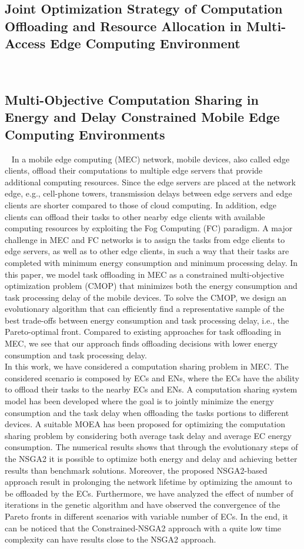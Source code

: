 \subsection{Joint Optimization Strategy of Computation Offloading and Resource Allocation in Multi-Access Edge Computing Environment}~\cite{li2020joint}


\subsection{Multi-Objective Computation Sharing in Energy and Delay Constrained Mobile Edge Computing Environments}~\cite{bozorgchenani2020multi}
In a mobile edge computing (MEC) network, mobile devices, also called edge clients, offload their computations to multiple
edge servers that provide additional computing resources. Since the edge servers are placed at the network edge, e.g., cell-phone
towers, transmission delays between edge servers and edge clients are shorter compared to those of cloud computing. In addition,
edge clients can offload their tasks to other nearby edge clients with available computing resources by exploiting the Fog Computing
(FC) paradigm. A major challenge in MEC and FC networks is to assign the tasks from edge clients to edge servers, as well as to other
edge clients, in such a way that their tasks are completed with minimum energy consumption and minimum processing delay. In this
paper, we model task offloading in MEC as a constrained multi-objective optimization problem (CMOP) that minimizes both the energy
consumption and task processing delay of the mobile devices. To solve the CMOP, we design an evolutionary algorithm that can
efficiently find a representative sample of the best trade-offs between energy consumption and task processing delay, i.e., the
Pareto-optimal front. Compared to existing approaches for task offloading in MEC, we see that our approach finds offloading decisions
with lower energy consumption and task processing delay.\\
In this work, we have considered a computation sharing
problem in MEC. The considered scenario is composed by
ECs and ENs, where the ECs have the ability to offload
their tasks to the nearby ECs and ENs. A computation
sharing system model has been developed where the goal
is to jointly minimize the energy consumption and the
task delay when offloading the tasks portions to different
devices. A suitable MOEA has been proposed for optimizing the computation sharing problem by considering both
average task delay and average EC energy consumption.
The numerical results shows that through the evolutionary
steps of the NSGA2 it is possible to optimize both energy
and delay and achieving better results than benchmark
solutions. Moreover, the proposed NSGA2-based approach
result in prolonging the network lifetime by optimizing the
amount to be offloaded by the ECs. Furthermore, we have
analyzed the effect of number of iterations in the genetic
algorithm and have observed the convergence of the Pareto
fronts in different scenarios with variable number of ECs.
In the end, it can be noticed that the Constrained-NSGA2
approach with a quite low time complexity can have results
close to the NSGA2 approach.

